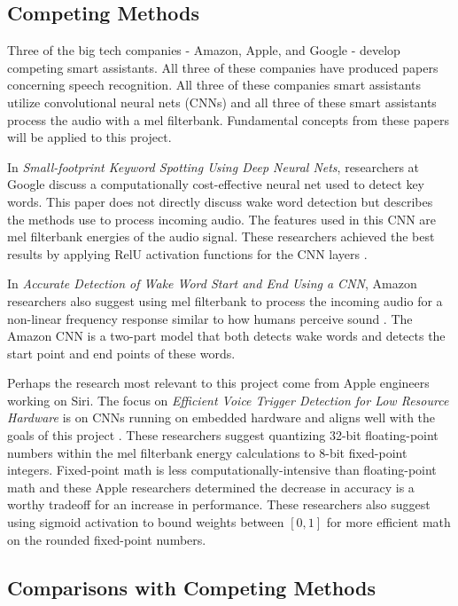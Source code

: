 \documentclass[conference]{IEEEtran}
\begin{document}
\subsection{Competing Methods}
Three of the big tech companies - Amazon, Apple, and Google - 
develop competing smart assistants.
All three of these companies have produced papers concerning speech recognition.
All three of these companies smart assistants utilize convolutional neural nets (CNNs)
and all three of these smart assistants process the audio with a mel filterbank.
Fundamental concepts from these papers will be applied to this project.

In \textit{Small-footprint Keyword Spotting Using Deep Neural Nets},
researchers at Google discuss a computationally cost-effective neural net used to detect key words.
This paper does not directly discuss wake word detection
but describes the methods use to process incoming audio.
The features used in this CNN are mel filterbank energies of the audio signal.
These researchers achieved the best results
by applying RelU activation functions for the CNN layers \cite{smallfoot}.

In \textit{Accurate Detection of Wake Word Start and End Using a CNN}, 
Amazon researchers also suggest using mel filterbank to process the incoming audio
for a non-linear frequency response similar to how humans perceive sound \cite{wordstart}.
The Amazon CNN is a two-part model that both detects wake words
and detects the start point and end points of these words.

Perhaps the research most relevant to this project come from Apple engineers working on Siri.
The focus on \textit{Efficient Voice Trigger Detection for Low Resource Hardware}
is on CNNs running on embedded hardware and aligns well with the goals of this project \cite{Efficient}.
These researchers suggest quantizing 32-bit floating-point numbers 
within the mel filterbank energy calculations to 8-bit fixed-point integers. 
Fixed-point math is less computationally-intensive than floating-point math
and these Apple researchers determined the decrease in accuracy is a worthy tradeoff
for an increase in performance.
These researchers also suggest using sigmoid activation 
to bound weights between $[0,1]$ for more efficient math on the rounded fixed-point numbers.

\subsection{Comparisons with Competing Methods}
\end{document}
